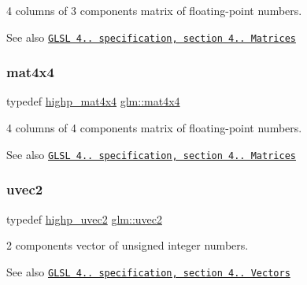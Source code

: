 4 columns of 3 components matrix of floating-\/point numbers.

\begin{DoxySeeAlso}{See also}
\href{http://www.opengl.org/registry/doc/GLSLangSpec.4.20.8.pdf}{\tt G\+L\+SL 4.. specification, section 4.. Matrices} 
\end{DoxySeeAlso}
\mbox{\label{group__core__types_ga63e3ee9447ed593484140a9368e738ec}} 
\subsubsection{\texorpdfstring{mat4x4}{mat4x4}}
{\footnotesize\ttfamily typedef \hyperlink{group__core__precision_gaccec2a0346f946bcbd656386a9ab87d7}{highp\+\_\+mat4x4} \hyperlink{group__core__types_ga63e3ee9447ed593484140a9368e738ec}{glm\+::mat4x4}}

4 columns of 4 components matrix of floating-\/point numbers.

\begin{DoxySeeAlso}{See also}
\href{http://www.opengl.org/registry/doc/GLSLangSpec.4.20.8.pdf}{\tt G\+L\+SL 4.. specification, section 4.. Matrices} 
\end{DoxySeeAlso}
\mbox{\label{group__core__types_gafd2041b45eff671aa8899d2c2835eee9}} 
\subsubsection{\texorpdfstring{uvec2}{uvec2}}
{\footnotesize\ttfamily typedef \hyperlink{group__core__precision_ga386eaa1579a0f5ad51cd7d8fcd52ec16}{highp\+\_\+uvec2} \hyperlink{group__core__types_gafd2041b45eff671aa8899d2c2835eee9}{glm\+::uvec2}}

2 components vector of unsigned integer numbers.

\begin{DoxySeeAlso}{See also}
\href{http://www.opengl.org/registry/doc/GLSLangSpec.4.20.8.pdf}{\tt G\+L\+SL 4.. specification, section 4.. Vectors} 
\end{DoxySeeAlso}
\mbox{\label{group__core__types_gac4ba593917841b859ba1683b8b52b8fa}} 
